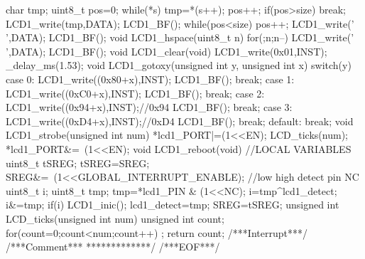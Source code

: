 \begin{verbatimtab}
{
	char tmp;
	uint8_t pos=0;
	while(*s){
		tmp=*(s++);
		pos++;
		if(pos>size)
		break;
		LCD1_write(tmp,DATA);
		LCD1_BF();
	}
	while(pos<size){
		pos++;
		LCD1_write(' ',DATA);
		LCD1_BF();
	}
}
void LCD1_hspace(uint8_t n)
{
	for(;n;n--){
		LCD1_write(' ',DATA);
		LCD1_BF();
	}
}
void LCD1_clear(void)
{
	LCD1_write(0x01,INST);
	_delay_ms(1.53);
}
void LCD1_gotoxy(unsigned int y, unsigned int x)
{
	switch(y){
		case 0:
		LCD1_write((0x80+x),INST);
		LCD1_BF();
		break;
		case 1:
		LCD1_write((0xC0+x),INST);
		LCD1_BF();
		break;
		case 2:
		LCD1_write((0x94+x),INST);//0x94
		LCD1_BF();
		break;
		case 3:
		LCD1_write((0xD4+x),INST);//0xD4
		LCD1_BF();
		break;
		default:
		break;
	}
}
void LCD1_strobe(unsigned int num)
{
	*lcd1_PORT|=(1<<EN);
	LCD_ticks(num);
	*lcd1_PORT&=~(1<<EN);
}
void LCD1_reboot(void)
{
	//LOCAL VARIABLES
	uint8_t tSREG;
	tSREG=SREG;
	SREG&=~(1<<GLOBAL_INTERRUPT_ENABLE);
	//low high detect pin NC
	uint8_t i;
	uint8_t tmp;
	tmp=*lcd1_PIN & (1<<NC);
	i=tmp^lcd1_detect;
	i&=tmp;
	if(i)
	LCD1_inic();
	lcd1_detect=tmp;
	SREG=tSREG;
}
unsigned int LCD_ticks(unsigned int num)
{
	unsigned int count;
	for(count=0;count<num;count++)
	;
	return count;
}
/***Interrupt***/
/***Comment***
*************/
/***EOF***/
\end{verbatimtab}